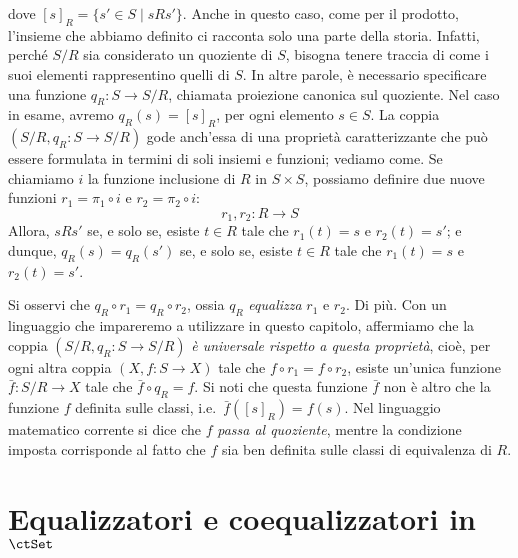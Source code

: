dove \([s]_R=\{s'\in S\mid sRs'\}\). Anche in questo caso, come per il prodotto, l'insieme che abbiamo definito ci racconta solo una parte della storia. Infatti, perché \(S/R\) sia considerato un quoziente di \(S\), bisogna tenere traccia di come i suoi elementi rappresentino quelli di \(S\). In altre parole, è necessario specificare una funzione \(q_R\colon S\to S/R\),  chiamata proiezione canonica sul quoziente. Nel caso in esame, avremo \(q_R(s)=[s]_R\), per ogni elemento \(s\in S\). La coppia \((S/R, q_R\colon S\to S/R)\) gode anch'essa di una proprietà caratterizzante che può essere formulata in termini di soli insiemi e funzioni; vediamo come.  Se chiamiamo $i$ la funzione inclusione di \(R\) in \(S\times  S\), possiamo definire due nuove funzioni \(r_1=\pi_1\circ i\) e \(r_2=\pi_2\circ i\):
\[
	r_1, r_2\colon R\to S
\]
Allora, \(s R s'\) se, e solo se, esiste \(t\in R\) tale che \(r_1(t)=s\) e \(r_2(t)=s'\); e dunque, \(q_R(s)=q_R(s')\) se, e solo se, esiste \(t\in R\) tale che \(r_1(t)=s\) e \(r_2(t)=s'\).

Si osservi che \(q_R\circ r_1=q_R\circ r_2 \), ossia \(q_R\) \emph{equalizza} \(r_1\) e \(r_2\). Di più. Con un linguaggio che impareremo a utilizzare in questo capitolo, affermiamo che la coppia \((S/R,q_R\colon S\to S/R)\) \emph{è universale rispetto a questa proprietà}, cioè, per ogni altra coppia \((X,f\colon S\to X)\) tale che  \(f\circ r_1=f\circ r_2 \), esiste un'unica funzione \(\bar f\colon S/R\to X\) tale che \(\bar f\circ q_R= f\). Si noti che questa funzione \(\bar f\) non è altro che la funzione \(f\) definita sulle classi, i.e.\ \(\bar f([s]_R)= f(s)\). Nel linguaggio matematico corrente si dice che \(f\) \emph{passa al quoziente}, mentre la condizione imposta corrisponde al fatto che \(f\) sia ben definita sulle classi di equivalenza di \(R\).
\begin{esercizi}
	\item
	\item
	\item
	\item
	\item
\end{esercizi}
\section{Equalizzatori e coequalizzatori in $\ctSet$}
\Todo{}
\begin{esercizi}
	\item
	\item
	\item
	\item
	\item
\end{esercizi}
